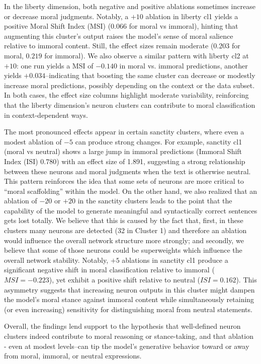 \documentclass[runninghheads]{llncs}
\begin{document}
In the liberty dimension, both negative and positive ablations sometimes increase or decrease moral judgments. Notably, a $+10$ ablation in liberty cl1 yields a positive Moral Shift Index (MSI) (0.066 for moral vs immoral), hinting that augmenting this cluster’s output raises the model’s sense of moral salience relative to immoral content. Still, the effect sizes remain moderate ($0.203$ for moral, $0.219$ for immoral). We also observe a similar pattern with liberty cl2 at $+10$: one run yields a MSI of $-0.140$ in moral vs. immoral predictions, another yields $+0.034$--indicating that boosting the same cluster can decrease or modestly increase moral predictions, possibly depending on the context or the data subset. In both cases, the effect size columns highlight moderate variability, reinforcing that the liberty dimension's neuron clusters can contribute to moral classification in context-dependent ways.

The most pronounced effects appear in certain sanctity clusters, where even a modest ablation of $-5$ can produce strong changes. For example, sanctity cl1 (moral vs neutral) shows a large jump in immoral predictions (Immoral Shift Index (ISI) 0.780) with an effect size of 1.891, suggesting a strong relationship between these neurons and moral judgments when the text is otherwise neutral. This pattern reinforces the idea that some sets of neurons are more critical to “moral scaffolding” within the model. On the other hand, we also realized that an ablation of $-20$ or $+20$ in the sanctity clusters leads to the point that the capability of the model to generate meaningful and syntactically correct sentences gets lost totally. We believe that this is caused by the fact that, first, in these clusters many neurons are detected (32 in Cluster 1) and therefore an ablation would influence the overall network structure more strongly; and secondly, we believe that some of those neurons could be superweights which influence the overall network stability. Notably, $+5$ ablations in sanctity cl1 produce a significant negative shift in moral classification relative to immoral ($MSI=-0.223$), yet exhibit a positive shift relative to neutral ($ISI=0.162$). This asymmetry suggests that increasing neuron outputs in this cluster might dampen the model's moral stance against immoral content while simultaneously retaining (or even increasing) sensitivity for distinguishing moral from neutral statements.

Overall, the findings lend support to the hypothesis that well-defined neuron clusters indeed contribute to moral reasoning or stance-taking, and that ablation - even at modest levels--can tip the model’s generative behavior toward or away from moral, immoral, or neutral expressions.
\end{document}

